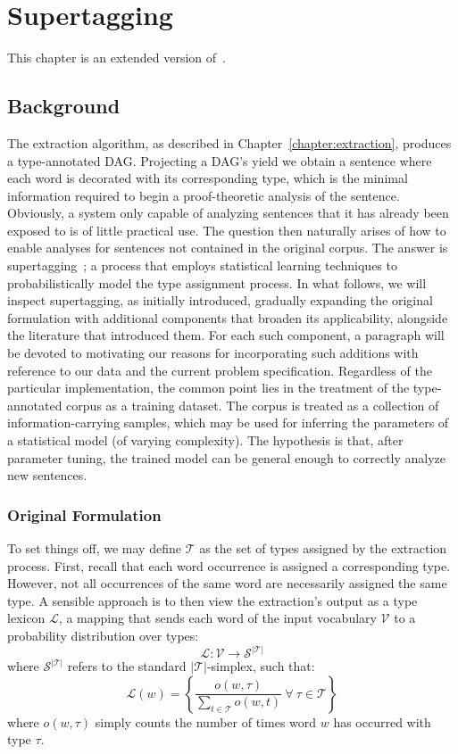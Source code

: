 \chapter{Supertagging}
This chapter is an extended version of~\cite{constructive}.

\section{Background}
The extraction algorithm, as described in Chapter~\ref{chapter:extraction}, produces a type-annotated DAG.
Projecting a DAG's yield we obtain a sentence where each word is decorated with its corresponding type, which is the minimal information required to begin a proof-theoretic analysis of the sentence.
Obviously, a system only capable of analyzing sentences that it has already been exposed to is of little practical use.
The question then naturally arises of how to enable analyses for sentences not contained in the original corpus.
The answer is supertagging~\cite{supertagging}; a process that employs statistical learning techniques to probabilistically model the type assignment process.
In what follows, we will inspect supertagging, as initially introduced, gradually expanding the original formulation with additional components that broaden its applicability, alongside the literature that introduced them. 
For each such component, a paragraph will be devoted to motivating our reasons for incorporating such additions with reference to our data and the current problem specification.
Regardless of the particular implementation, the common point lies in the treatment of the type-annotated corpus as a training dataset. 
The corpus is treated as a collection of information-carrying samples, which may be used for inferring the parameters of a statistical model (of varying complexity).
The hypothesis is that, after parameter tuning, the trained model can be general enough to correctly analyze new sentences.

\subsection{Original Formulation}
To set things off, we may define $\mathcal{T}$ as the set of types assigned by the extraction process.
First, recall that each word occurrence is assigned a corresponding type.
However, not all occurrences of the same word are necessarily assigned the same type.
A sensible approach is to then view the extraction's output as a type lexicon $\mathcal L$, a mapping that sends each word of the input vocabulary $\mathcal{V}$ to a probability distribution over types:
\[
\mathcal{L}: \mathcal{V} \to \mathcal{S}^{|\mathcal{T}|}
\]
where $\mathcal{S}^{|\mathcal{T}|}$ refers to the standard $|\mathcal{T}|$-simplex, such that:
\[
\mathcal{L}(w) = \left \{ \frac{o(w, \tau)}{\sum_{t \in \mathcal{T}}{o(w, t)}} \ \forall \ \tau \in \mathcal{T} \right \} 
\]
where $o(w, \tau)$ simply counts the number of times word $w$ has occurred with type $\tau$.

